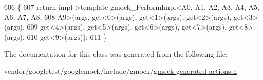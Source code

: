 \begin{DoxyCode}
606                                  \{
607     \textcolor{keywordflow}{return} impl->template gmock\_PerformImpl<A0, A1, A2, A3, A4, A5, A6, A7, A8,
608         A9>(args, get<0>(args), get<1>(args), get<2>(args), get<3>(args),
609         get<4>(args), get<5>(args), get<6>(args), get<7>(args), get<8>(args),
610         get<9>(args));
611   \}
\end{DoxyCode}


The documentation for this class was generated from the following file\+:\begin{DoxyCompactItemize}
\item 
vendor/googletest/googlemock/include/gmock/\hyperlink{gmock-generated-actions_8h}{gmock-\/generated-\/actions.\+h}\end{DoxyCompactItemize}
